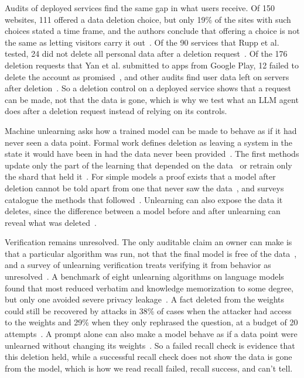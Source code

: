 Audits of deployed services find the same gap in what users receive. Of 150 websites, 111 offered a data deletion choice, but only 19\% of the sites with such choices stated a time frame, and the authors conclude that offering a choice is not the same as letting visitors carry it out~\cite{habib2019empirical}. Of the 90 services that Rupp et al. tested, 24 did not delete all personal data after a deletion request~\cite{rupp2022leave}. Of the 176 deletion requests that Yan et al. submitted to apps from Google Play, 12 failed to delete the account as promised~\cite{yan2025sign}, and other audits find user data left on servers after deletion~\cite{santhanam2022scraping}. So a deletion control on a deployed service shows that a request can be made, not that the data is gone, which is why we test what an LLM agent does after a deletion request instead of relying on its controls.

Machine unlearning asks how a trained model can be made to behave as if it had never seen a data point. Formal work defines deletion as leaving a system in the state it would have been in had the data never been provided~\cite{garg2020formalizing}. The first methods update only the part of the learning that depended on the data~\cite{cao2015towards} or retrain only the shard that held it~\cite{bourtoule2021machine}. For simple models a proof exists that a model after deletion cannot be told apart from one that never saw the data~\cite{guo2020certified}, and surveys catalogue the methods that followed~\cite{xu2023machine}. Unlearning can also expose the data it deletes, since the difference between a model before and after unlearning can reveal what was deleted~\cite{chen2021unlearning}.

Verification remains unresolved. The only auditable claim an owner can make is that a particular algorithm was run, not that the final model is free of the data~\cite{thudi2022necessity}, and a survey of unlearning verification treats verifying it from behavior as unresolved~\cite{xue2026towards}. A benchmark of eight unlearning algorithms on language models found that most reduced verbatim and knowledge memorization to some degree, but only one avoided severe privacy leakage~\cite{shi2025muse}. A fact deleted from the weights could still be recovered by attacks in 38\% of cases when the attacker had access to the weights and 29\% when they only rephrased the question, at a budget of 20 attempts~\cite{patil2024sensitive}. A prompt alone can also make a model behave as if a data point were unlearned without changing its weights~\cite{pawelczyk2024incontext}. So a failed recall check is evidence that this deletion held, while a successful recall check does not show the data is gone from the model, which is how we read recall failed, recall success, and can't tell.

